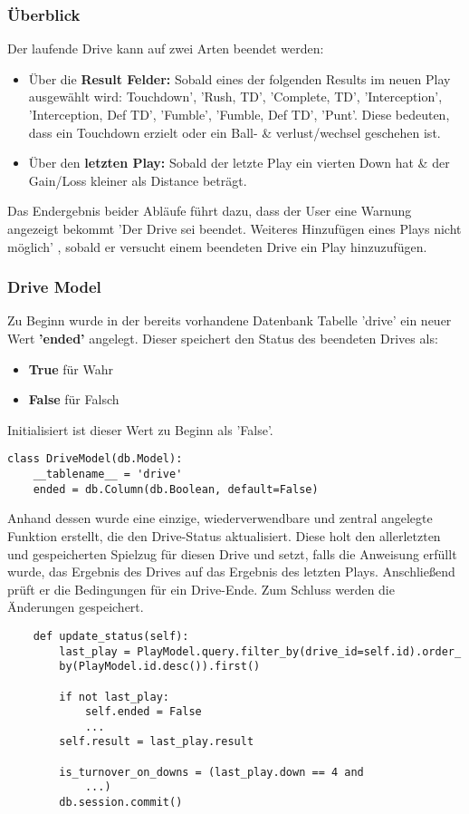 \subsubsection{Überblick}
Der laufende Drive kann auf zwei Arten beendet werden:
\begin{itemize}
    \item Über die \textbf {Result Felder:} Sobald eines der folgenden Results im neuen Play ausgewählt wird: Touchdown', 'Rush, TD', 'Complete, TD', 'Interception', 'Interception, Def TD', 'Fumble', 'Fumble, Def TD', 'Punt'. Diese bedeuten, dass ein Touchdown erzielt oder ein Ball- \& verlust/wechsel geschehen ist.
    \item Über den \textbf{letzten Play:} Sobald der letzte Play ein vierten Down hat \& der Gain/Loss kleiner als Distance beträgt.
\end{itemize}
\noindent
Das Endergebnis beider Abläufe führt dazu, dass der User eine Warnung angezeigt bekommt 'Der Drive sei beendet. Weiteres Hinzufügen eines Plays nicht möglich' , sobald er versucht einem beendeten Drive ein Play hinzuzufügen.

\newpage
\subsubsection{Drive Model}
Zu Beginn wurde in der bereits vorhandene Datenbank Tabelle 'drive' ein neuer Wert \textbf{'ended'} angelegt. Dieser speichert den Status des beendeten Drives als:
\begin{itemize}
    \item\textbf{True} für Wahr
    \item\textbf{False} für Falsch
\end{itemize} 
Initialisiert ist dieser Wert zu Beginn als 'False'.
\begin{verbatim}
class DriveModel(db.Model):
    __tablename__ = 'drive'
    ended = db.Column(db.Boolean, default=False)
\end{verbatim}
\noindent
Anhand dessen wurde eine einzige, wiederverwendbare und zentral angelegte Funktion erstellt, die den Drive-Status aktualisiert. Diese holt den allerletzten und gespeicherten Spielzug für diesen Drive und setzt, falls die Anweisung erfüllt wurde, das Ergebnis des Drives auf das Ergebnis des letzten Plays. Anschließend prüft er die Bedingungen für ein Drive-Ende. Zum Schluss werden die Änderungen gespeichert.
\begin{verbatim}
    def update_status(self):
        last_play = PlayModel.query.filter_by(drive_id=self.id).order_
        by(PlayModel.id.desc()).first()

        if not last_play:
            self.ended = False
            ...
        self.result = last_play.result

        is_turnover_on_downs = (last_play.down == 4 and
            ...)
        db.session.commit()
\end{verbatim}
